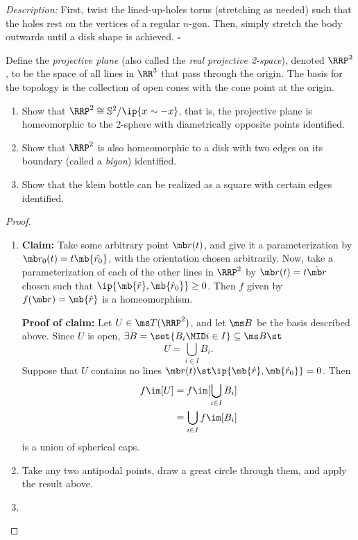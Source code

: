 \noindent \emph{Description:} First, twist the lined-up-holes torus (stretching
as needed) such that the holes rest on the vertices of a regular $n$-gon. Then,
simply stretch the body outwards until a disk shape is achieved. \hfill $\square$
\begin{definition}
  Define the \emph{projective plane} (also called the \emph{real projective
    2-space}), denoted $\RRP^2$, to be the space of all lines in $\RR^3$ that
  pass through the origin. The basis for the topology is the collection of open
  cones with the cone point at the origin.
\end{definition}
\begin{problem}[12.3]
  \begin{enumerate}
    \item Show that $\RRP^2 \cong \mathbb{S}^2/\ip{x \sim -x}$, that is, the
      projective plane is homeomorphic to the 2-sphere with diametrically
      opposite points identified.
    \item Show that $\RRP^2$ is also homeomorphic to a disk with two edges on
      its boundary (called a \emph{bigon}) identified.
    \item Show that the klein bottle can be realized as a square with certain
      edges identified.
  \end{enumerate}
\end{problem}
\begin{proof}
  \begin{enumerate}
    \item \textbf{Claim:} Take some arbitrary point $\mb r(t)$, and give it a
      parameterization by $\mb r_0(t) = t \mb{\hat{r_0}}$, with the orientation
      chosen arbitrarily. Now, take a parameterization of each of the other
      lines in $\RRP^2$ by $\mb r(t) = t \hat{\mb r}$ chosen such that
      $\ip{\mb{\hat r}, \mb{\hat{r}_0}} \geq 0$. Then $f$ given by $f(\mb r) =
      \mb{\hat{r}}$ is a homeomorphism.

      \textbf{Proof of claim:} Let $U \in \ms T(\RRP^2)$, and let $\ms B$ be the
      basis described above. Since $U$ is open, $\exists B = \set{B_i \MID i \in
        I} \subseteq \ms B \st$
      \[
        U = \bigcup_{i \in I} B_i.
      \]
      Suppose that $U$ contains no lines $\mb r(t) \st \ip{\mb{\hat r},
        \mb{\hat{r}_0}} = 0$. Then
      \begin{align*}
        f\im[U]
        &= f\im[\bigcup_{i \in I}B_i] \\
        &= \bigcup_{i \in I} f\im[B_i]
      \end{align*}
      is a union of spherical caps.
    \item Take any two antipodal points, draw a great circle through them, and
      apply the result above.
    \item
  \end{enumerate}
\end{proof}


